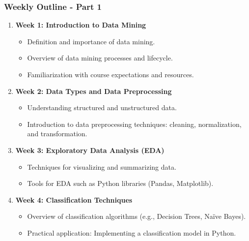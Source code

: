 \documentclass[aspectratio=169]{beamer}
\begin{document}
\begin{frame}[fragile]
    \frametitle{Weekly Outline - Part 1}
    \begin{enumerate}
        \item \textbf{Week 1: Introduction to Data Mining}
            \begin{itemize}
                \item Definition and importance of data mining.
                \item Overview of data mining processes and lifecycle.
                \item Familiarization with course expectations and resources.
            \end{itemize}
        \item \textbf{Week 2: Data Types and Data Preprocessing}
            \begin{itemize}
                \item Understanding structured and unstructured data.
                \item Introduction to data preprocessing techniques: cleaning, normalization, and transformation.
            \end{itemize}
        \item \textbf{Week 3: Exploratory Data Analysis (EDA)}
            \begin{itemize}
                \item Techniques for visualizing and summarizing data.
                \item Tools for EDA such as Python libraries (Pandas, Matplotlib).
            \end{itemize}
        \item \textbf{Week 4: Classification Techniques}
            \begin{itemize}
                \item Overview of classification algorithms (e.g., Decision Trees, Naïve Bayes).
                \item Practical application: Implementing a classification model in Python.
            \end{itemize}
    \end{enumerate}
\end{frame}
\end{document}
